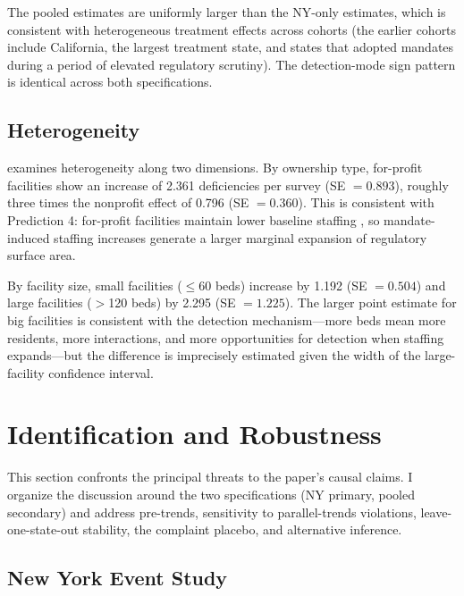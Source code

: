 \documentclass[12pt]{article}
\begin{document}
The pooled estimates are uniformly larger than the NY-only estimates, which is consistent with heterogeneous treatment effects across cohorts (the earlier cohorts include California, the largest treatment state, and states that adopted mandates during a period of elevated regulatory scrutiny). The detection-mode sign pattern is identical across both specifications.

\subsection{Heterogeneity}



 examines heterogeneity along two dimensions. By ownership type, for-profit facilities show an increase of 2.361 deficiencies per survey (SE $= 0.893$), roughly three times the nonprofit effect of 0.796 (SE $= 0.360$). This is consistent with Prediction 4: for-profit facilities maintain lower baseline staffing \citep{harrington2012}, so mandate-induced staffing increases generate a larger marginal expansion of regulatory surface area.

By facility size, small facilities ($\leq$60 beds) increase by 1.192 (SE $= 0.504$) and large facilities ($>$120 beds) by 2.295 (SE $= 1.225$). The larger point estimate for big facilities is consistent with the detection mechanism---more beds mean more residents, more interactions, and more opportunities for detection when staffing expands---but the difference is imprecisely estimated given the width of the large-facility confidence interval.


\section{Identification and Robustness}
\label{sec:robustness}

This section confronts the principal threats to the paper's causal claims. I organize the discussion around the two specifications (NY primary, pooled secondary) and address pre-trends, sensitivity to parallel-trends violations, leave-one-state-out stability, the complaint placebo, and alternative inference.

\subsection{New York Event Study}
\end{document}
